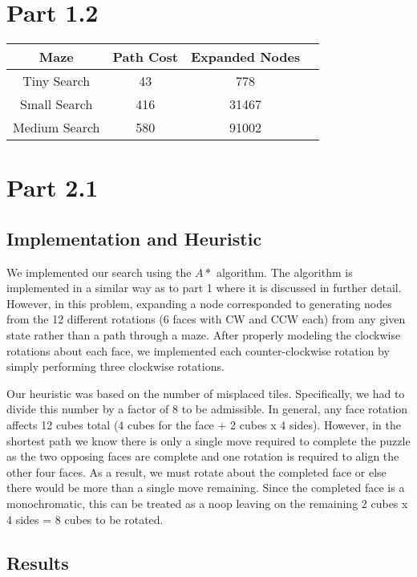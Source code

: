 \documentclass{article}
\begin{document}
\section{Part 1.2}

\begin{center}
\begin{tabular}{|c|c|c|c|}
\hline\textbf{Maze} & \textbf{Path Cost} & \textbf{Expanded Nodes} \\
\hline\hline Tiny Search & 43 & 778 \\
\hline Small Search & 416 & 31467 \\
\hline Medium Search & 580 & 91002 \\
\hline
\end{tabular}
\end{center}

\section{Part 2.1}

\subsection{Implementation and Heuristic}

We implemented our search using the $A*$ algorithm. The algorithm is implemented in a similar way as to part 1 where it is discussed in further detail. However, in this problem, expanding a node corresponded to generating nodes from the 12 different rotations (6 faces with CW and CCW each) from any given state rather than a path through a maze. After properly modeling the clockwise rotations about each face, we implemented each counter-clockwise rotation by simply performing three clockwise rotations.

Our heuristic was based on the number of misplaced tiles. Specifically, we had to divide this number by a factor of 8 to be admissible. In general, any face rotation affects 12 cubes total (4 cubes for the face + 2 cubes x 4 sides). However, in the shortest path we know there is only a single move required to complete the puzzle as the two opposing faces are complete and one rotation is required to align the other four faces. As a result, we must rotate about the completed face or else there would be more than a single move remaining. Since the completed face is a monochromatic, this can be treated as a noop leaving on the remaining 2 cubes x 4 sides = 8 cubes to be rotated.

\subsection{Results}
\end{document}
